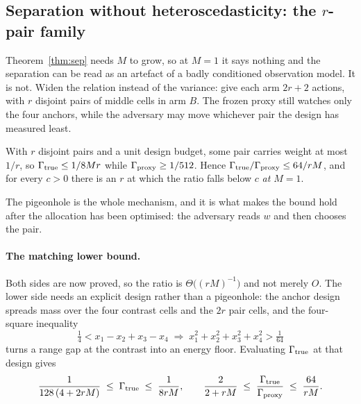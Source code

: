 
\subsection{Separation without heteroscedasticity: the $r$-pair family}
\label{sec:rpair}

Theorem~\ref{thm:sep} needs $M$ to grow, so at $M=1$ it says nothing and the separation can
be read as an artefact of a badly conditioned observation model. It is not. Widen the
relation instead of the variance: give each arm $2r+2$ actions, with $r$ disjoint pairs of
middle cells in arm $B$. The frozen proxy still watches only the four anchors, while the
adversary may move whichever pair the design has measured least.

\begin{theorem}
\label{thm:rpair}
With $r$ disjoint pairs and a unit design budget, some pair carries weight at most $1/r$, so
$\Gamma_{\rm true}\le1/8Mr$ while $\Gamma_{\rm proxy}\ge1/512$. Hence
$\Gamma_{\rm true}/\Gamma_{\rm proxy}\le64/rM$, and for every $c>0$ there is an $r$ at which
the ratio falls below $c$ \emph{at $M=1$}.
\end{theorem}

The pigeonhole is the whole mechanism, and it is what makes the bound hold after the
allocation has been optimised: the adversary reads $w$ and then chooses the pair.


\paragraph{The matching lower bound.}
Both sides are now proved, so the ratio is $\Theta\bigl((rM)^{-1}\bigr)$ and not merely
$O$. The lower side needs an explicit design rather than a pigeonhole: the anchor design
spreads mass over the four contrast cells and the $2r$ pair cells, and the four-square
inequality
\[
\tfrac{1}{4}<x_{1}-x_{2}+x_{3}-x_{4}
\;\Longrightarrow\;
x_{1}^{2}+x_{2}^{2}+x_{3}^{2}+x_{4}^{2}>\tfrac{1}{64}
\]
turns a range gap at the contrast into an energy floor. Evaluating $\Gamma_{\rm true}$ at
that design gives
\[
\frac{1}{128\,(4+2rM)}\;\le\;\Gamma_{\rm true}\;\le\;\frac{1}{8rM},
\qquad
\frac{2}{2+rM}\;\le\;\frac{\Gamma_{\rm true}}{\Gamma_{\rm proxy}}\;\le\;\frac{64}{rM}.
\]

